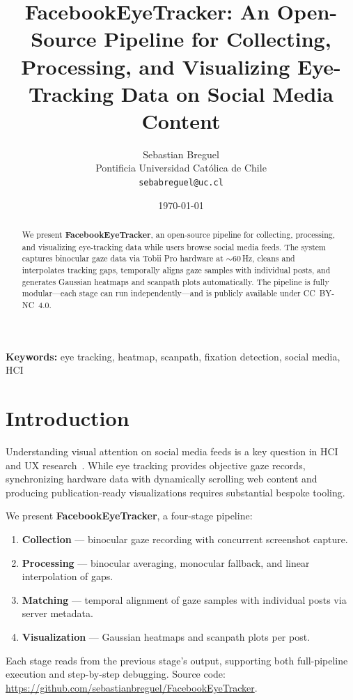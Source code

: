 \documentclass[11pt,a4paper]{article}
\title{%
  FacebookEyeTracker: An Open-Source Pipeline for Collecting, Processing,
  and Visualizing Eye-Tracking Data on Social Media Content%
}
\author{
  Sebastian Breguel \\
  Pontificia Universidad Cat\'olica de Chile \\
  \texttt{sebabreguel@uc.cl}
}
\date{\today}
\begin{document}
\maketitle

\begin{abstract}
We present \textbf{FacebookEyeTracker}, an open-source pipeline for
collecting, processing, and visualizing eye-tracking data while users
browse social media feeds. The system captures binocular gaze data via
Tobii Pro hardware at ${\sim}60$\,Hz, cleans and interpolates tracking
gaps, temporally aligns gaze samples with individual posts, and generates
Gaussian heatmaps and scanpath plots automatically. The pipeline is fully
modular---each stage can run independently---and is publicly available
under CC~BY-NC~4.0.
\end{abstract}

\noindent\textbf{Keywords:}
eye tracking, heatmap, scanpath, fixation detection, social media, HCI

\section{Introduction}
\label{sec:intro}

Understanding visual attention on social media feeds is a key question in
HCI and UX research~\citep{duchowski2017eye}. While eye tracking provides
objective gaze records, synchronizing hardware data with dynamically
scrolling web content and producing publication-ready visualizations
requires substantial bespoke tooling.

We present \textbf{FacebookEyeTracker}, a four-stage pipeline:
\begin{enumerate}
  \item \textbf{Collection} --- binocular gaze recording with concurrent
        screenshot capture.
  \item \textbf{Processing} --- binocular averaging, monocular fallback,
        and linear interpolation of gaps.
  \item \textbf{Matching} --- temporal alignment of gaze samples with
        individual posts via server metadata.
  \item \textbf{Visualization} --- Gaussian heatmaps and scanpath plots
        per post.
\end{enumerate}

Each stage reads from the previous stage's output, supporting both
full-pipeline execution and step-by-step debugging. Source code:
\url{https://github.com/sebastianbreguel/FacebookEyeTracker}.
\end{document}
